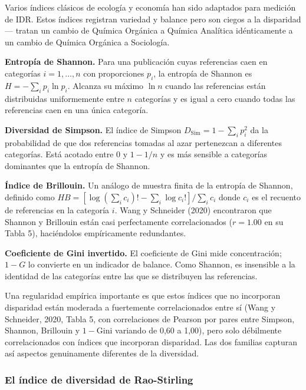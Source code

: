 \documentclass[
]{article}
\begin{document}
Varios índices clásicos de ecología y economía han sido adaptados para
medición de IDR. Estos índices registran variedad y balance pero son
ciegos a la disparidad --- tratan un cambio de Química Orgánica a
Química Analítica idénticamente a un cambio de Química Orgánica a
Sociología.

\textbf{Entropía de Shannon.} Para una publicación cuyas referencias
caen en categorías \(i = 1, \ldots, n\) con proporciones \(p_i\), la
entropía de Shannon es \(H = -\sum_{i} p_i \ln p_i\). Alcanza su máximo
\(\ln n\) cuando las referencias están distribuidas uniformemente entre
\(n\) categorías y es igual a cero cuando todas las referencias caen en
una única categoría.

\textbf{Diversidad de Simpson.} El índice de Simpson
\(D_{\mathrm{Sim}} = 1 - \sum_i p_i^2\) da la probabilidad de que dos
referencias tomadas al azar pertenezcan a diferentes categorías. Está
acotado entre 0 y \(1 - 1/n\) y es más sensible a categorías dominantes
que la entropía de Shannon.

\textbf{Índice de Brillouin.} Un análogo de muestra finita de la
entropía de Shannon, definido como
\(HB = [\log(\sum_i c_i)! - \sum_i \log c_i!] / \sum_i c_i\) donde
\(c_i\) es el recuento de referencias en la categoría \(i\). Wang y
Schneider (2020) encontraron que Shannon y Brillouin están casi
perfectamente correlacionados (\(r = 1.00\) en su Tabla 5), haciéndolos
empíricamente redundantes.

\textbf{Coeficiente de Gini invertido.} El coeficiente de Gini mide
concentración; \(1 - G\) lo convierte en un indicador de balance. Como
Shannon, es insensible a la identidad de las categorías entre las que se
distribuyen las referencias.

Una regularidad empírica importante es que estos índices que no
incorporan disparidad están moderada a fuertemente correlacionados entre
sí (Wang y Schneider, 2020, Tabla 5, con correlaciones de Pearson por
pares entre Simpson, Shannon, Brillouin y \(1 - \text{Gini}\) variando
de 0,60 a 1,00), pero solo débilmente correlacionados con índices que
incorporan disparidad. Las dos familias capturan así aspectos
genuinamente diferentes de la diversidad.

\hypertarget{el-uxedndice-de-diversidad-de-rao-stirling}{%
\subsubsection{El índice de diversidad de
Rao-Stirling}\label{el-uxedndice-de-diversidad-de-rao-stirling}}
\end{document}
